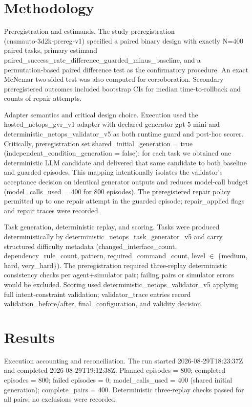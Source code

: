\documentclass[conference]{IEEEtran}
\begin{document}
\section{Methodology}
Preregistration and estimands. The study preregistration (cnsmauto‑3d2k‑prereg‑v1) specified a paired binary design with exactly N=400 paired tasks, primary estimand paired\_success\_rate\_difference\_guarded\_minus\_baseline, and a permutation‑based paired difference test as the confirmatory procedure. An exact McNemar two‑sided test was also computed for corroboration. Secondary preregistered outcomes included bootstrap CIs for median time‑to‑rollback and counts of repair attempts.

Adapter semantics and critical design choice. Execution used the hosted\_netops\_gvr\_v1 adapter with declared generator gpt‑5‑mini and deterministic\_netops\_validator\_v5 as both runtime guard and post‑hoc scorer. Critically, preregistration set shared\_initial\_generation = true (independent\_condition\_generation = false): for each task we obtained one deterministic LLM candidate and delivered that same candidate to both baseline and guarded episodes. This mapping intentionally isolates the validator's acceptance decision on identical generator outputs and reduces model‑call budget (model\_calls\_used = 400 for 800 episodes). The preregistered repair policy permitted up to one repair attempt in the guarded episode; repair\_applied flags and repair traces were recorded.

Task generation, deterministic replay, and scoring. Tasks were produced deterministically by deterministic\_netops\_task\_generator\_v5 and carry structured difficulty metadata (changed\_interface\_count, dependency\_rule\_count, pattern, required\_command\_count, level \ensuremath{\in} \{medium, hard, very\_hard\}). The preregistration required three‑replay deterministic consistency checks per agent+simulator pair; failing pairs or simulator errors would be excluded. Scoring used deterministic\_netops\_validator\_v5 applying full intent‑constraint validation; validator\_trace entries record validation\_before/after, final\_configuration, and validity decision.

\section{Results}
Execution accounting and reconciliation. The run started 2026‑08‑29T18:23:37Z and completed 2026‑08‑29T19:12:38Z. Planned episodes = 800; completed episodes = 800; failed episodes = 0; model\_calls\_used = 400 (shared initial generation); complete\_pairs = 400. Deterministic three‑replay checks passed for all pairs; no exclusions were recorded.
\end{document}
